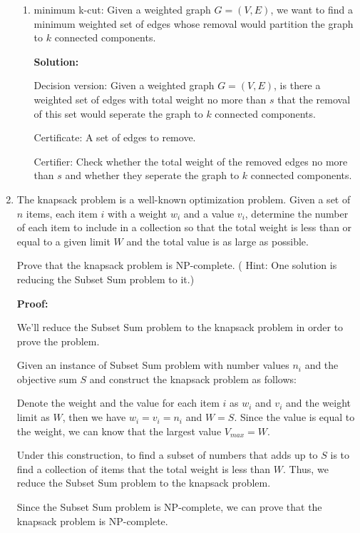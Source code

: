 \documentclass[12pt,a4paper]{article}
\theoremstyle{definition}
\numberwithin{equation}{section}
\numberwithin{figure}{section}
\begin{document}
\begin{enumerate}
\begin{enumerate}
	  \item minimum k-cut: Given a weighted graph $G=(V,E)$, we want to find a minimum weighted set of edges whose removal would partition the graph to $k$ connected components.
	  
	  \textbf{Solution:}
	  
	 Decision version: Given a weighted graph $G = (V,E)$, is there a weighted set of edges with total weight no more than $s$ that the removal of this set would seperate the graph to $k$ connected components.
	 
Certificate: A set of edges to remove.
	 
Certifier: Check whether the total weight of the removed edges no more than $s$ and whether they seperate the graph to $k$ connected components.
	  
    \end{enumerate}

  \item The knapsack problem is a well-known optimization problem. Given a set of $n$ items, each item $i$ with a weight $w_i$ and a value $v_i$, determine the number of each item to include in a collection so that the total weight is less than or equal to a given limit $W$ and the total value is as large as possible.

  Prove that the knapsack problem is NP-complete. {(\color{blue} Hint: One solution is reducing the Subset Sum problem to it.)}
  
  \textbf{Proof:}
  
  We'll reduce the Subset Sum problem to the knapsack problem in order to prove the problem.
  
Given an instance of Subset Sum problem with number values $n_i$ and the objective sum $S$ and construct the knapsack problem as follows:
  
   Denote the weight and the value for each item $i$ as $w_i$ and $v_i$ and the weight limit as $W$, then we have $w_i =v_i =n_i$ and $W =S$. Since the value is equal to the weight, we can know that the largest value $V_{max} = W$.
   
    Under this construction, to find a subset of numbers that adds up to $S$ is to find a collection of items that the total weight is less than $W$. Thus, we reduce the Subset Sum problem to the knapsack problem.
    
Since the Subset Sum problem is NP-complete, we can prove that the knapsack problem is NP-complete.
  
  


\end{enumerate}
\end{document}

